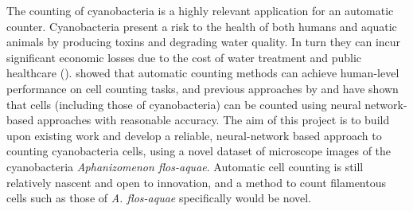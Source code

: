 The counting of cyanobacteria is a highly relevant application for an automatic counter. Cyanobacteria present a risk to the health of both humans and aquatic animals by producing toxins and degrading water quality. In turn they can incur significant economic losses due to the cost of water treatment and public healthcare (\cite{Identification-and-enumeration-of-cyanobacteria}). \cite{Do-experts-make-mistakes} showed that automatic counting methods can achieve human-level performance on cell counting tasks, and previous approaches by \cite{xie2018microscopy} and \cite{Identification-and-enumeration-of-cyanobacteria} have shown that cells (including those of cyanobacteria) can be counted using neural network-based approaches with reasonable accuracy. The aim of this project is to build upon existing work and develop a reliable, neural-network based approach to counting cyanobacteria cells, using a novel dataset of microscope images of the cyanobacteria \emph{Aphanizomenon flos-aquae}. Automatic cell counting is still relatively nascent and open to innovation, and a method to count filamentous cells such as those of \textit{A. flos-aquae} specifically would be novel.
